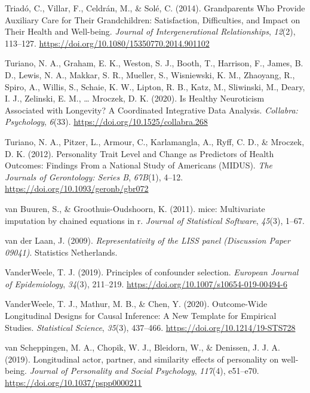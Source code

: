 \documentclass[
  english,
  man, noextraspace]{apa7}
\begin{document}
\leavevmode\hypertarget{ref-triadoGrandparentsWhoProvide2014}{}%
Triadó, C., Villar, F., Celdrán, M., \& Solé, C. (2014). Grandparents Who Provide Auxiliary Care for Their Grandchildren: Satisfaction, Difficulties, and Impact on Their Health and Well-being. \emph{Journal of Intergenerational Relationships}, \emph{12}(2), 113--127. \url{https://doi.org/10.1080/15350770.2014.901102}

\leavevmode\hypertarget{ref-turianoHealthyNeuroticismAssociated2020}{}%
Turiano, N. A., Graham, E. K., Weston, S. J., Booth, T., Harrison, F., James, B. D., Lewis, N. A., Makkar, S. R., Mueller, S., Wisniewski, K. M., Zhaoyang, R., Spiro, A., Willis, S., Schaie, K. W., Lipton, R. B., Katz, M., Sliwinski, M., Deary, I. J., Zelinski, E. M., \ldots{} Mroczek, D. K. (2020). Is Healthy Neuroticism Associated with Longevity? A Coordinated Integrative Data Analysis. \emph{Collabra: Psychology}, \emph{6}(33). \url{https://doi.org/10.1525/collabra.268}

\leavevmode\hypertarget{ref-turianoPersonalityTraitLevel2012}{}%
Turiano, N. A., Pitzer, L., Armour, C., Karlamangla, A., Ryff, C. D., \& Mroczek, D. K. (2012). Personality Trait Level and Change as Predictors of Health Outcomes: Findings From a National Study of Americans (MIDUS). \emph{The Journals of Gerontology: Series B}, \emph{67B}(1), 4--12. \url{https://doi.org/10.1093/geronb/gbr072}

\leavevmode\hypertarget{ref-mice2011}{}%
van Buuren, S., \& Groothuis-Oudshoorn, K. (2011). mice: Multivariate imputation by chained equations in r. \emph{Journal of Statistical Software}, \emph{45}(3), 1--67.

\leavevmode\hypertarget{ref-vanderlaanRepresentativityLISSPanel2009}{}%
van der Laan, J. (2009). \emph{Representativity of the LISS panel (Discussion Paper 09041)}. Statistics Netherlands.

\leavevmode\hypertarget{ref-vanderweelePrinciplesConfounderSelection2019}{}%
VanderWeele, T. J. (2019). Principles of confounder selection. \emph{European Journal of Epidemiology}, \emph{34}(3), 211--219. \url{https://doi.org/10.1007/s10654-019-00494-6}

\leavevmode\hypertarget{ref-vanderweeleOutcomeWideLongitudinalDesigns2020}{}%
VanderWeele, T. J., Mathur, M. B., \& Chen, Y. (2020). Outcome-Wide Longitudinal Designs for Causal Inference: A New Template for Empirical Studies. \emph{Statistical Science}, \emph{35}(3), 437--466. \url{https://doi.org/10.1214/19-STS728}

\leavevmode\hypertarget{ref-vanscheppingenLongitudinalActorPartner2019}{}%
van Scheppingen, M. A., Chopik, W. J., Bleidorn, W., \& Denissen, J. J. A. (2019). Longitudinal actor, partner, and similarity effects of personality on well-being. \emph{Journal of Personality and Social Psychology}, \emph{117}(4), e51--e70. \url{https://doi.org/10.1037/pspp0000211}
\end{document}
